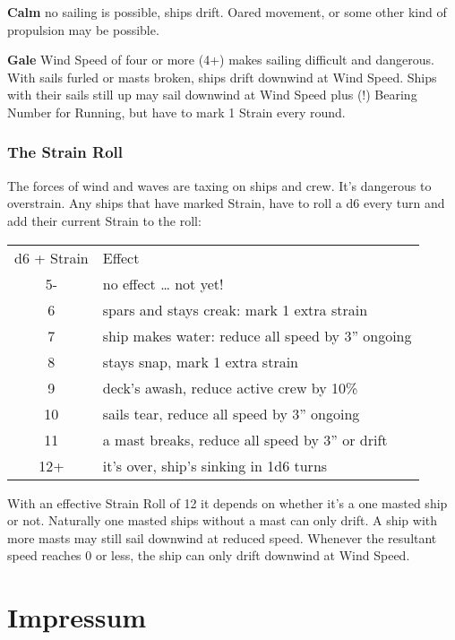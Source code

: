 \documentclass[11pt]{wbzine}
\begin{document}
\begin{multicols}{2}
\textbf{Calm} no sailing is possible, ships drift. Oared movement, or
some other kind of propulsion may be possible.

\textbf{Gale} Wind Speed of four or more (4+) makes sailing difficult
and dangerous. With sails furled or masts broken, ships drift downwind
at Wind Speed. Ships with their sails still up may sail downwind at Wind
Speed plus (!) Bearing Number for Running, but have to mark 1 Strain
every round.

\subsubsection{The Strain Roll}

The forces of wind and waves are taxing on ships and crew. It's
dangerous to overstrain. Any ships that have marked Strain, have to roll
a d6 every turn and add their current Strain to the roll:

\begin{tabularx}{\columnwidth}{cZ}
d6 + Strain & Effect \\
5- & no effect \ldots{} not yet! \\
6 & spars and stays creak: mark 1 extra strain \\
7 & ship makes water: reduce all speed by 3'' ongoing \\
8 & stays snap, mark 1 extra strain \\
9 & deck's awash, reduce active crew by 10\% \\
10 & sails tear, reduce all speed by 3'' ongoing \\
11 & a mast breaks, reduce all speed by 3'' or drift \\
12+ & it's over, ship's sinking in 1d6 turns \\
\end{tabularx}

With an effective Strain Roll of 12 it depends on whether it's a one
masted ship or not. Naturally one masted ships without a mast can only
drift. A ship with more masts may still sail downwind at reduced speed.
Whenever the resultant speed reaches 0 or less, the ship can only drift
downwind at Wind Speed.

\end{multicols}




\section{Impressum}
\end{document}
